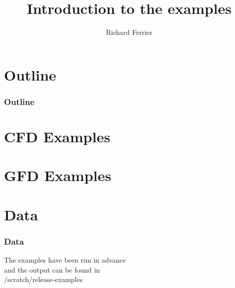 \documentclass[10pt]{beamer}
\title[All examples]{Introduction to the examples}
\subtitle[]{}
\institute{Department of Earth Science and Engineering, Imperial College London}
\author[Richard Ferrier]{\large{Richard Ferrier}}
\date{}
\begin{document}
\begin{frame}
  \titlepage
\end{frame}

\section*{Outline}
\begin{frame}
  \frametitle{Outline}
  \tableofcontents
\end{frame}

\section{CFD Examples}







\section{GFD Examples}








\section*{Data}
\begin{frame}
  \frametitle{Data}
  \begin{center}
  The examples have been run in advance \\ and the output can be found in \\ /scratch/release-examples
  \end{center}
\end{frame}
\end{document}
